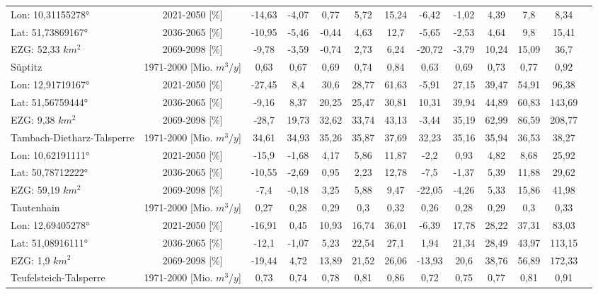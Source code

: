 \begin{longtable}{@{\extracolsep{\fill}}lc|ccccc||cccccc}
\cline{2-13} 
Lon: 10,31155278° & 2021-2050 [\%]  & -14,63 & -4,07 & 0,77 & 5,72 & 15,24 & -6,42 & -1,02 & 4,39 & 7,8 & 8,34 & \\ 
Lat: 51,73869167° & 2036-2065 [\%]  & -10,95 & -5,46 & -0,44 & 4,63 & 12,7 & -5,65 & -2,53 & 4,64 & 9,8 & 15,41 & \\ 
EZG: 52,33 $km^2$ & 2069-2098 [\%]  & -9,78 & -3,59 & -0,74 & 2,73 & 6,24 & -20,72 & -3,79 & 10,24 & 15,09 & 36,7 & \\ 
\hline 
Süptitz & 1971-2000 [Mio. $m^3/y$]  & 0,63 & 0,67 & 0,69 & 0,74 & 0,84 & 0,63 & 0,69 & 0,73 & 0,77 & 0,92 & \\ 
\cline{2-13} 
Lon: 12,91719167° & 2021-2050 [\%]  & -27,45 & 8,4 & 30,6 & 28,77 & 61,63 & -5,91 & 27,15 & 39,47 & 54,91 & 96,38 & \\ 
Lat: 51,56759444° & 2036-2065 [\%]  & -9,16 & 8,37 & 20,25 & 25,47 & 30,81 & 10,31 & 39,94 & 44,89 & 60,83 & 143,69 & \\ 
EZG: 9,38 $km^2$ & 2069-2098 [\%]  & -28,7 & 19,73 & 32,62 & 33,74 & 43,13 & -3,44 & 35,19 & 62,99 & 86,59 & 208,77 & \\ 
\hline 
Tambach-Dietharz-Talsperre & 1971-2000 [Mio. $m^3/y$]  & 34,61 & 34,93 & 35,26 & 35,87 & 37,69 & 32,23 & 35,16 & 35,94 & 36,53 & 38,27 & \\ 
\cline{2-13} 
Lon: 10,62191111° & 2021-2050 [\%]  & -15,9 & -1,68 & 4,17 & 5,86 & 11,87 & -2,2 & 0,93 & 4,82 & 8,68 & 25,92 & \\ 
Lat: 50,78712222° & 2036-2065 [\%]  & -10,55 & -2,69 & 0,95 & 2,23 & 12,78 & -7,5 & -1,37 & 5,39 & 11,88 & 29,62 & \\ 
EZG: 59,19 $km^2$ & 2069-2098 [\%]  & -7,4 & -0,18 & 3,25 & 5,88 & 9,47 & -22,05 & -4,26 & 5,33 & 15,86 & 41,98 & \\ 
\hline 
Tautenhain & 1971-2000 [Mio. $m^3/y$]  & 0,27 & 0,28 & 0,29 & 0,3 & 0,32 & 0,26 & 0,28 & 0,29 & 0,3 & 0,33 & \\ 
\cline{2-13} 
Lon: 12,69405278° & 2021-2050 [\%]  & -16,91 & 0,45 & 10,93 & 16,74 & 36,01 & -6,39 & 17,78 & 28,22 & 37,31 & 83,03 & \\ 
Lat: 51,08916111° & 2036-2065 [\%]  & -12,1 & -1,07 & 5,23 & 22,54 & 27,1 & 1,94 & 21,34 & 28,49 & 43,97 & 113,15 & \\ 
EZG: 1,9 $km^2$ & 2069-2098 [\%]  & -19,44 & 4,72 & 13,89 & 21,52 & 26,06 & -13,93 & 20,6 & 38,76 & 56,89 & 172,33 & \\ 
\hline 
Teufelsteich-Talsperre & 1971-2000 [Mio. $m^3/y$]  & 0,73 & 0,74 & 0,78 & 0,81 & 0,86 & 0,72 & 0,75 & 0,77 & 0,81 & 0,91 & \\ 

\end{longtable}
